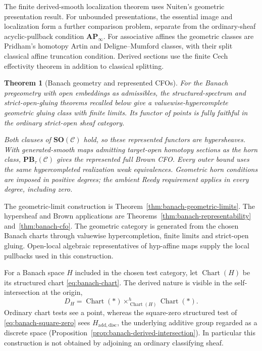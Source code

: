 \documentclass[12pt]{amsart}
\newtheorem{maintheorem}{Theorem}
\theoremstyle{definition}
\theoremstyle{remark}
\numberwithin{equation}{section}
\begin{document}
The finite derived-smooth localization theorem
uses Nuiten's geometric presentation result.
For unbounded presentations, the essential image and
localization form a further comparison problem, separate
from the ordinary-sheaf acyclic-pullback condition
$\mathbf{AP}_\infty$.
For associative affines the geometric classes
are Pridham's homotopy Artin and
Deligne--Mumford classes, with their split
classical affine truncation condition.
Derived sections use the finite Cech effectivity theorem
in addition to classical splitting.

\begin{maintheorem}[Banach geometry and represented CFOs]
\label{main:banach}
For the Banach pregeometry with open embeddings as admissibles,
the structured-spectrum and strict-open-gluing theorems recalled
below give a valuewise-hypercomplete geometric gluing class
with finite limits. Its functor of points is fully faithful
in the ordinary strict-open sheaf category.

Both clauses of $\mathbf{SO}(\mathcal C)$ hold, so these
represented functors are hypersheaves. With generated-smooth
maps admitting target-open homotopy sections as the horn class,
$\mathbf{PB}_\tau(\mathcal C)$ gives the represented full Brown CFO.
Every outer bound uses the same hypercompleted
realization weak equivalences. Geometric horn conditions
are imposed in positive degrees; the ambient Reedy
requirement applies in every degree, including zero.
\end{maintheorem}

The geometric-limit construction is
Theorem~\ref{thm:banach-geometric-limits}.
The hypersheaf and Brown applications are
Theorems~\ref{thm:banach-representability}
and~\ref{thm:banach-cfo}.
The geometric category is generated from the chosen
Banach charts through valuewise hypercompletion, finite
limits and strict-open gluing. Open-local algebraic
representatives of hyp-affine maps supply the local
pullbacks used in this construction.

For a Banach space $H$ included in the chosen test category, let
$\operatorname{Chart}(H)$ be its structured chart
\eqref{eq:banach-chart}. The derived nature is visible in the
self-intersection at the origin,
\[
 D_H=\operatorname{Chart}(*)\times^h_{\operatorname{Chart}(H)}
                         \operatorname{Chart}(*).
\]
Ordinary chart tests see a point, whereas the square-zero structured
test of \eqref{eq:banach-square-zero} sees $H_{\mathrm{add,disc}}$,
the underlying additive group regarded as a discrete space
(Proposition~\ref{prop:banach-derived-intersection}).
In particular this construction is not obtained
by adjoining an ordinary classifying sheaf.
\end{document}
